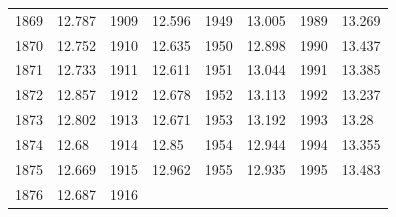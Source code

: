 \begin{description}[noitemsep]
\begin{description}[noitemsep]
\begin{table}[H]
\begin{center}
\begin{xtabular}[t]{|l|l|l|l|l|l|l|l|}
        	1869	 &
        	12.787	 &
        	1909	 &
        	12.596	 &
        	1949	 &
        	13.005	 &
        	1989	 &
        	13.269	%
     \tabularnewline{}
        	1870	 &
        	12.752	 &
        	1910	 &
        	12.635	 &
        	1950	 &
        	12.898	 &
        	1990	 &
        	13.437	%
     \tabularnewline{}
        	1871	 &
        	12.733	 &
        	1911	 &
        	12.611	 &
        	1951	 &
        	13.044	 &
        	1991	 &
        	13.385	%
     \tabularnewline{}
        	1872	 &
        	12.857	 &
        	1912	 &
        	12.678	 &
        	1952	 &
        	13.113	 &
        	1992	 &
        	13.237	%
     \tabularnewline{}
        	1873	 &
        	12.802	 &
        	1913	 &
        	12.671	 &
        	1953	 &
        	13.192	 &
        	1993	 &
        	13.28	%
     \tabularnewline{}
        	1874	 &
        	12.68	 &
        	1914	 &
        	12.85	 &
        	1954	 &
        	12.944	 &
        	1994	 &
        	13.355	%
     \tabularnewline{}
        	1875	 &
        	12.669	 &
        	1915	 &
        	12.962	 &
        	1955	 &
        	12.935	 &
        	1995	 &
        	13.483	%
     \tabularnewline{}
        	1876	 &
        	12.687	 &
        	1916	 &

\end{xtabular}
\end{center}
\end{table}
\end{description}
\end{description}
